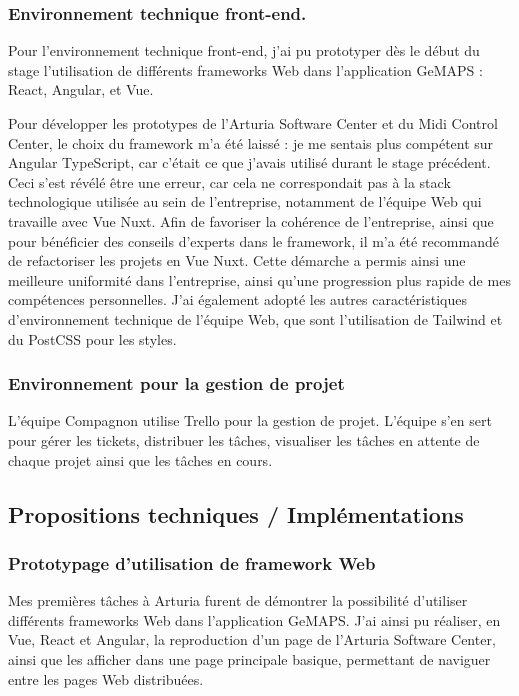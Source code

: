 \documentclass[francais]{rapportPFE}  %
\begin{document}
\subsubsection{Environnement technique front-end.}

Pour l'environnement technique front-end, j'ai pu prototyper dès le début du stage l'utilisation de différents frameworks Web dans l'application GeMAPS : React, Angular, et Vue.  

Pour développer les prototypes de l'Arturia Software Center et du Midi Control Center, le choix du framework m'a été laissé : je me sentais plus compétent sur Angular TypeScript, car c'était ce que j'avais utilisé durant le stage précédent. Ceci s'est révélé être une erreur, car cela ne correspondait pas à la stack technologique utilisée au sein de l'entreprise, notamment de l'équipe Web qui travaille avec Vue Nuxt. Afin de favoriser la cohérence de l'entreprise, ainsi que pour bénéficier des conseils d'experts dans le framework, il m'a été recommandé de refactoriser les projets en Vue Nuxt. Cette démarche a permis ainsi une meilleure uniformité dans l'entreprise, ainsi qu'une progression plus rapide de mes compétences personnelles. J'ai également adopté les autres caractéristiques d'environnement technique de l'équipe Web, que sont l'utilisation de Tailwind et du PostCSS pour les styles. 

\subsubsection{Environnement pour la gestion de projet}
L'équipe Compagnon utilise Trello pour la gestion de projet. L'équipe s'en sert pour gérer les tickets, distribuer les tâches, visualiser les tâches en attente de chaque projet ainsi que les tâches en cours.

\subsection{Propositions techniques / Implémentations}
\subsubsection{Prototypage d'utilisation de framework Web}
Mes premières tâches à Arturia furent de démontrer la possibilité d'utiliser différents frameworks Web dans l'application GeMAPS.
J'ai ainsi pu réaliser, en Vue, React et Angular, la reproduction d'un page de l'Arturia Software Center, ainsi que les afficher dans une page principale basique, permettant de naviguer entre les pages Web distribuées. 
\end{document}
